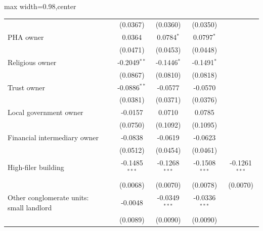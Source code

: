 \begin{table}[htbp]
\begin{adjustbox}{max width=0.98\textwidth,center}
\begin{tabular}{lccccc}
                                                    &                 & (0.0367)        & (0.0360)        & (0.0350)        &   \\   
         PHA owner                                  &                 & 0.0364          & 0.0784$^{*}$    & 0.0797$^{*}$    &   \\   
                                                    &                 & (0.0471)        & (0.0453)        & (0.0448)        &   \\   
         Religious owner                            &                 & -0.2049$^{**}$  & -0.1446$^{*}$   & -0.1491$^{*}$   &   \\   
                                                    &                 & (0.0867)        & (0.0810)        & (0.0818)        &   \\   
         Trust owner                                &                 & -0.0886$^{**}$  & -0.0577         & -0.0570         &   \\   
                                                    &                 & (0.0381)        & (0.0371)        & (0.0376)        &   \\   
         Local government owner                     &                 & -0.0157         & 0.0710          & 0.0785          &   \\   
                                                    &                 & (0.0750)        & (0.1092)        & (0.1095)        &   \\   
         Financial intermediary owner               &                 & -0.0838         & -0.0619         & -0.0623         &   \\   
                                                    &                 & (0.0512)        & (0.0454)        & (0.0461)        &   \\   
         High-filer building                        &                 & -0.1485$^{***}$ & -0.1268$^{***}$ & -0.1508$^{***}$ & -0.1261$^{***}$\\   
                                                    &                 & (0.0068)        & (0.0070)        & (0.0078)        & (0.0070)\\   
         Other conglomerate units: small landlord   &                 & -0.0048         & -0.0349$^{***}$ & -0.0336$^{***}$ &   \\   
                                                    &                 & (0.0089)        & (0.0090)        & (0.0090)        &   \\   

\end{tabular}
\end{adjustbox}
\end{table}
